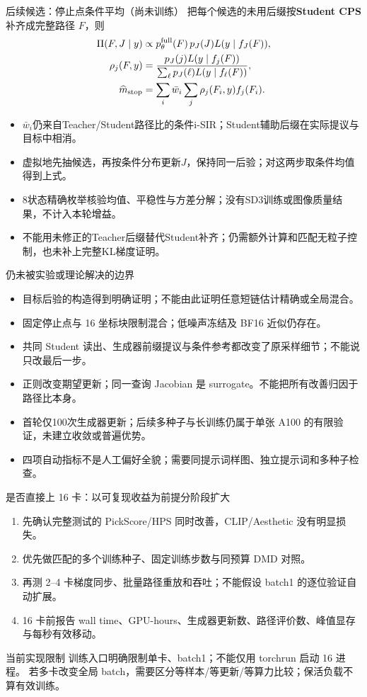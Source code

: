 \documentclass[10pt,aspectratio=169]{beamer}
\begin{document}
\begin{frame}{后续候选：停止点条件平均（尚未训练）}
\small
把每个候选的未用后缀按\textbf{Student CPS}补齐成完整路径 $F$，则
\begin{align}
\Pi(F,J\mid y)&\propto p_\theta^{\rm full}(F)\,p_J(J)L(y\mid f_J(F)),\\
\rho_j(F,y)&=\frac{p_J(j)L(y\mid f_j(F))}{\sum_\ell p_J(\ell)L(y\mid f_\ell(F))},\\
\widehat m_{\rm stop}&=\sum_i\bar w_i\sum_j\rho_j(F_i,y)f_j(F_i).
\end{align}
\begin{itemize}\itemsep4pt
\item $\bar w_i$仍来自Teacher/Student路径比的条件i-SIR；Student辅助后缀在实际提议与目标中相消。
\item 虚拟地先抽候选，再按条件分布更新$J$，保持同一后验；对这两步取条件均值得到上式。
\item 8状态精确枚举核验均值、平稳性与方差分解；没有SD3训练或图像质量结果，不计入本轮增益。
\item 不能用未修正的Teacher后缀替代Student补齐；仍需额外计算和匹配无粒子控制，也未补上完整KL梯度证明。
\end{itemize}
\end{frame}
\begin{frame}{仍未被实验或理论解决的边界}
\small
\begin{itemize}\itemsep6pt
\item 目标后验的构造得到明确证明；不能由此证明任意短链估计精确或全局混合。
\item 固定停止点与 16 坐标块限制混合；低噪声冻结及 BF16 近似仍存在。
\item 共同 Student 读出、生成器前缀提议与条件参考都改变了原采样细节；不能说只改最后一步。
\item 正则改变期望更新；同一查询 Jacobian 是 surrogate。不能把所有改善归因于路径比本身。
\item 首轮仅100次生成器更新；后续多种子与长训练仍属于单张 A100 的有限验证，未建立收敛或普遍优势。
\item 四项自动指标不是人工偏好全貌；需要同提示词样图、独立提示词和多种子检查。
\end{itemize}
\end{frame}

\begin{frame}{是否直接上 16 卡：以可复现收益为前提分阶段扩大}
\small
\begin{enumerate}\itemsep6pt
\item 先确认完整测试的 PickScore/HPS 同时改善，CLIP/Aesthetic 没有明显损失。
\item 优先做匹配的多个训练种子、固定训练步数与同预算 DMD 对照。
\item 再测 2--4 卡梯度同步、批量路径重放和吞吐；不能假设 batch1 的逐位验证自动扩展。
\item 16 卡前报告 wall time、GPU-hours、生成器更新数、路径评价数、峰值显存与每秒有效移动。
\end{enumerate}
\begin{alertblock}{当前实现限制}
训练入口明确限制单卡、batch1；不能仅用 torchrun 启动 16 进程。
若多卡改变全局 batch，需要区分等样本/等更新/等算力比较；保活负载不算有效训练。
\end{alertblock}
\end{frame}
\end{document}
